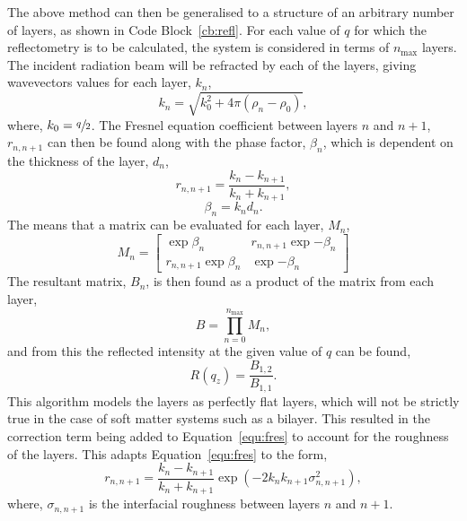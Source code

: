 The above method can then be generalised to a structure of an arbitrary number of layers, as shown in Code Block~\ref{cb:refl}.
For each value of $q$ for which the reflectometry is to be calculated, the system is considered in terms of $n_{\text{max}}$ layers.
The incident radiation beam will be refracted by each of the layers, giving wavevectors values for each layer, $k_n$,
%
\begin{equation}
    k_n = \sqrt{k_0^2 + 4\pi (\rho_n - \rho_0)},
\end{equation}
%
where, $k_0=\sfrac{q}{2}$.
The Fresnel equation coefficient between layers $n$ and $n+1$, $r_{n,n+1}$ can then be found along with the phase factor, $\beta_n$, which is dependent on the thickness of the layer, $d_n$,
%
\begin{equation}
    r_{n,n+1} = \frac{k_n - k_{n+1}}{k_n + k_{n+1}},
    \label{equ:fres}
\end{equation}
%
%
\begin{equation}
    \beta_n = k_n d_n.
\end{equation}
%
The means that a matrix can be evaluated for each layer, $M_n$,
%
\begin{equation}
    M_n =
    \begin{bmatrix}
        \exp{\beta_n} & r_{n,n+1}\exp{-\beta_n} \\ r_{n,n+1}\exp{\beta_n} & \exp{-\beta_n}
    \end{bmatrix}
\end{equation}
%
The resultant matrix, $B_n$, is then found as a product of the matrix from each layer,
%
\begin{equation}
    B = \prod_{n=0}^{n_{\text{max}}} M_n,
\end{equation}
%
and from this the reflected intensity at the given value of $q$ can be found,
%
\begin{equation}
    R(q_z) = \frac{B_{1,2}}{B_{1,1}}.
\end{equation}
%
This algorithm models the layers as perfectly flat layers, which will not be strictly true in the case of soft matter systems such as a bilayer.
This resulted in the correction term being added to Equation~\ref{equ:fres} to account for the roughness of the layers.
This adapts Equation~\ref{equ:fres} to the form,
%
\begin{equation}
    r_{n,n+1} = \frac{k_n - k_{n+1}}{k_n + k_{n+1}}\exp{(-2k_nk_{n+1}\sigma^2_{n,n+1})},
\end{equation}
%
where, $\sigma_{n,n+1}$ is the interfacial roughness between layers $n$ and $n+1$.
